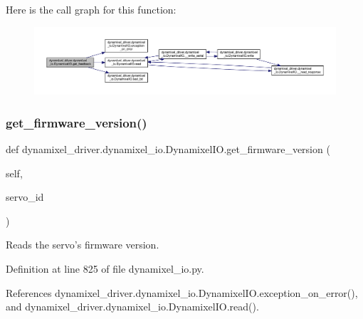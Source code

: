 Here is the call graph for this function\+:
\nopagebreak
\begin{figure}[H]
\begin{center}
\leavevmode
\includegraphics[width=350pt]{dd/d77/classdynamixel__driver_1_1dynamixel__io_1_1_dynamixel_i_o_a91841058e6c53561236ab08762438d52_cgraph}
\end{center}
\end{figure}
\mbox{\label{classdynamixel__driver_1_1dynamixel__io_1_1_dynamixel_i_o_a14d10031059c6c40dae76d3d9324a81c}} 
\subsubsection{\texorpdfstring{get\+\_\+firmware\+\_\+version()}{get\_firmware\_version()}}
{\footnotesize\ttfamily def dynamixel\+\_\+driver.\+dynamixel\+\_\+io.\+Dynamixel\+I\+O.\+get\+\_\+firmware\+\_\+version (\begin{DoxyParamCaption}\item[{}]{self,  }\item[{}]{servo\+\_\+id }\end{DoxyParamCaption})}

\begin{DoxyVerb}Reads the servo's firmware version. \end{DoxyVerb}
 

Definition at line 825 of file dynamixel\+\_\+io.\+py.



References dynamixel\+\_\+driver.\+dynamixel\+\_\+io.\+Dynamixel\+I\+O.\+exception\+\_\+on\+\_\+error(), and dynamixel\+\_\+driver.\+dynamixel\+\_\+io.\+Dynamixel\+I\+O.\+read().



